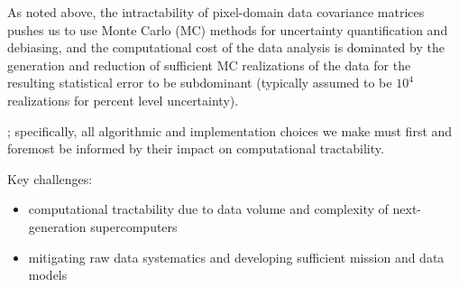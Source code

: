 As noted above, the intractability of pixel-domain data covariance matrices pushes us to use Monte Carlo (MC) methods for uncertainty quantification and debiasing, and the computational cost of the data analysis is dominated by the generation and reduction of sufficient MC realizations of the data for the resulting statistical error to be subdominant (typically assumed to be $10^4$ realizations for percent level uncertainty). 


; specifically, all algorithmic and implementation choices we make must first and foremost be informed by their impact on computational tractability.


Key challenges:
\begin{itemize}
\item computational tractability due to data volume and complexity of next-generation supercomputers
\item mitigating raw data systematics and developing sufficient mission and data models
\end{itemize}


%



